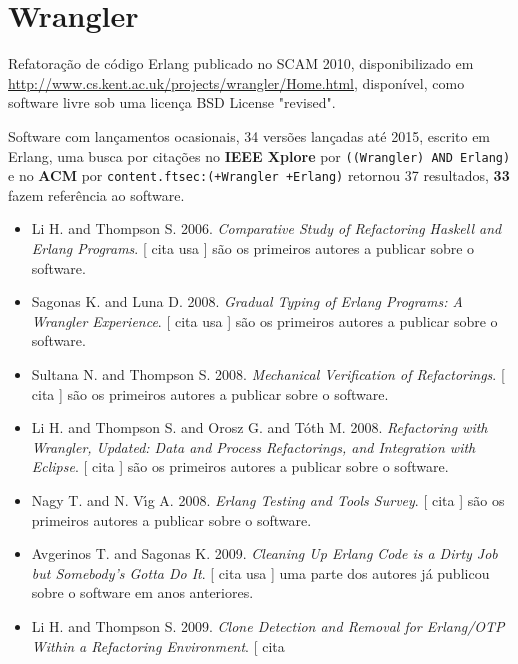 \section{Wrangler}

Refatoração de código Erlang
publicado no SCAM 2010,
disponibilizado em \url{http://www.cs.kent.ac.uk/projects/wrangler/Home.html},
disponível,
como software livre
sob uma licença BSD License "revised".

Software com lançamentos ocasionais,
34 versões lançadas
até 2015,
escrito em Erlang,
uma busca por citações no {\bf IEEE Xplore} por
\texttt{((Wrangler) AND Erlang)}
e no {\bf ACM} por
\texttt{content.ftsec:(+Wrangler +Erlang)}
retornou
37 resultados,
{\bf 33} fazem referência ao software.

\begin{itemize}
\item Li H. and Thompson S.
      2006.
        \textit{ Comparative Study of Refactoring Haskell and Erlang Programs}.
      [
          cita
          usa
      ]
são os primeiros autores a publicar sobre o software.
\item Sagonas K. and Luna D.
      2008.
        \textit{ Gradual Typing of Erlang Programs: A Wrangler Experience}.
      [
          cita
          usa
      ]
são os primeiros autores a publicar sobre o software.
\item Sultana N. and Thompson S.
      2008.
        \textit{ Mechanical Verification of Refactorings}.
      [
          cita
      ]
são os primeiros autores a publicar sobre o software.
\item Li H. and Thompson S. and Orosz G. and T\'{o}th M.
      2008.
        \textit{ Refactoring with Wrangler, Updated: Data and Process Refactorings, and Integration with Eclipse}.
      [
          cita
      ]
são os primeiros autores a publicar sobre o software.
\item Nagy T. and N. V\'{\i}g A.
      2008.
        \textit{ Erlang Testing and Tools Survey}.
      [
          cita
      ]
são os primeiros autores a publicar sobre o software.
\item Avgerinos T. and Sagonas K.
      2009.
        \textit{ Cleaning Up Erlang Code is a Dirty Job but Somebody's Gotta Do It}.
      [
          cita
          usa
      ]
uma parte dos autores já publicou sobre o software em anos anteriores.
\item Li H. and Thompson S.
      2009.
        \textit{ Clone Detection and Removal for Erlang/OTP Within a Refactoring Environment}.
      [
          cita

\end{itemize}
